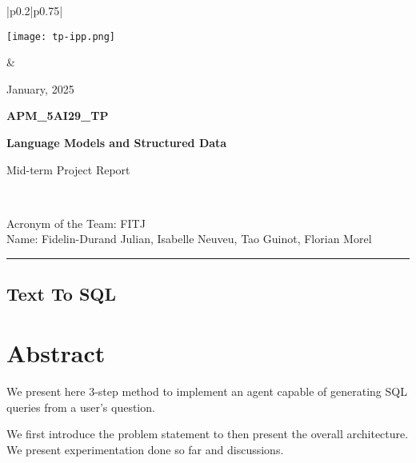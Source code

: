\documentclass[12pt,a4paper]{article}
\begin{document}
\begin{center}
  \begin{tabular}{|p{0.2\textwidth}|p{0.75\textwidth}|}
    \hline
    {
    \vspace{0cm} %
    \centerline{\texttt{[image: tp-ipp.png]}}
    }
    & {
      \vspace{0cm} %
      \centering
      \large
      {\hfill January, 2025}
      
      \vspace*{.5cm}
      \textbf{APM\_5AI29\_TP}
      
      \vspace*{.5cm}
      {\Large\textbf{Language Models and Structured Data}}
      
      \vspace*{.5cm}
      Mid-term Project Report

      \vspace*{1cm}
      } \\
    \hline
  \end{tabular}
\end{center}

\noindent Acronym of the Team: FITJ\\
Name:	Fidelin-Durand Julian, Isabelle Neuveu, Tao Guinot, Florian Morel

{\centering\rule{\linewidth}{.5pt}}


\begin{center}
\section*{Text To SQL}
\end{center}
\section*{Abstract}

We present here  3-step method to implement an agent capable of generating SQL queries from a user's question.

We first introduce the problem statement to then present the overall architecture. We present experimentation done so far and discussions. 
\end{document}
